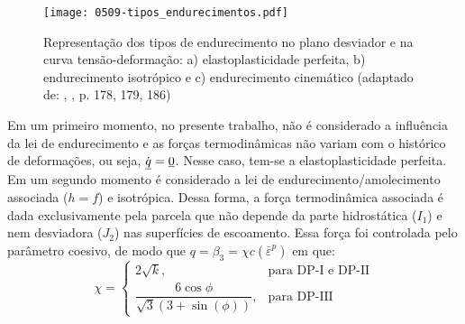 \begin{figure}[H]
	\begin{center}
		\texttt{[image: 0509-tipos\_endurecimentos.pdf]}
	\end{center}
	\caption{\label{tipos_endurecimento}Representação dos tipos de endurecimento no plano desviador e na curva tensão-deformação: a) elastoplasticidade perfeita, b) endurecimento isotrópico e c) endurecimento cinemático (adaptado de: \citeauthor{Neto2008}, \citeyear{Neto2008}, p. 178, 179, 186)}
\end{figure}
Em um primeiro momento, no presente trabalho, não é considerado a influência da lei de endurecimento e as forças termodinâmicas não variam com o histórico de deformações, ou seja, $\dot {\underline q} = \underline 0$. Nesse caso, tem-se a elastoplasticidade perfeita. Em um segundo momento é considerado a lei de endurecimento/amolecimento associada ($h = f$) e isotrópica. Dessa forma, a força termodinâmica associada é dada exclusivamente pela parcela que não depende da parte hidrostática ($I_1$) e nem desviadora ($J_2$) nas superfícies de escoamento. Essa força foi controlada pelo parâmetro coesivo, de modo que $q = \beta_3 = \chi c(\bar \varepsilon^p)$ em que:
\begin{equation}
	\label{eq:dfdc}
	\chi = \left\{ \begin{array}{ll} 
		2\sqrt{k}, & \text{para DP-I e DP-II} \\
		\dfrac{6\cos{\phi}}{\sqrt{3}(3 + \sin(\phi))}, & \text{para DP-III}\end{array}	
	\right.
\end{equation}



